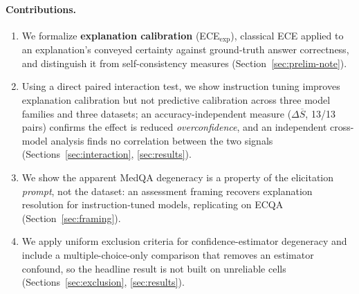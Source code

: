 \documentclass[letterpaper]{article} %
\begin{document}
\paragraph{Contributions.} \begin{enumerate} \item We formalize \textbf{explanation calibration} (ECE$_{\text{exp}}$), classical ECE \citep{guo2017calibration} applied to an explanation's conveyed certainty against ground-truth answer correctness, and distinguish it from self-consistency measures (Section~\ref{sec:prelim-note}). \item Using a direct paired interaction test, we show instruction tuning improves explanation calibration but not predictive calibration across three model families and three datasets; an accuracy-independent measure ($\Delta\overline{S}$, 13/13 pairs) confirms the effect is reduced \emph{overconfidence}, and an independent cross-model analysis finds no correlation between the two signals (Sections~\ref{sec:interaction}, \ref{sec:results}). \item We show the apparent MedQA degeneracy is a property of the elicitation \emph{prompt}, not the dataset: an assessment framing recovers explanation resolution for instruction-tuned models, replicating on ECQA (Section~\ref{sec:framing}). \item We apply uniform exclusion criteria for confidence-estimator degeneracy and include a multiple-choice-only comparison that removes an estimator confound, so the headline result is not built on unreliable cells (Sections~\ref{sec:exclusion}, \ref{sec:results}). \end{enumerate}
\end{document}
